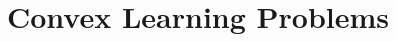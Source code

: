 \chapter{Convex Learning Problems}

\begin{ex}
\end{ex}

\begin{ex}
\end{ex}

\begin{ex}
\end{ex}

\begin{ex}
\end{ex}